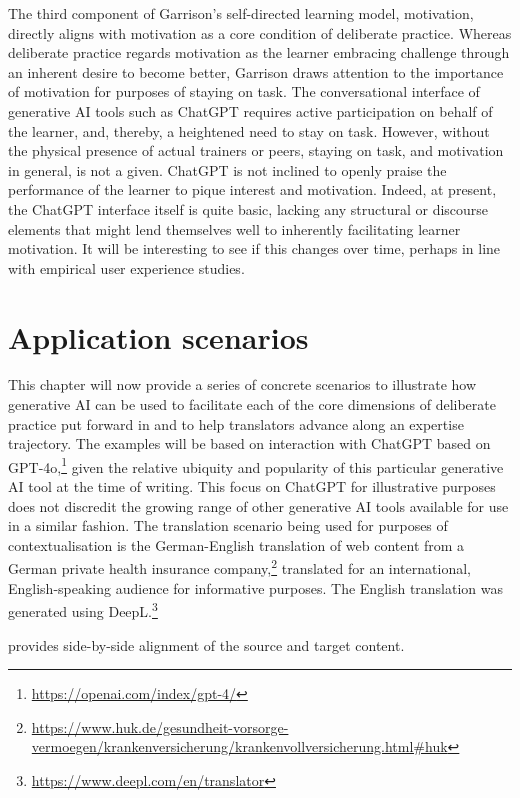 \documentclass[output=paper]{langscibook}
\begin{document}
The third component of Garrison’s self-directed learning model, motivation, directly aligns with motivation as a core condition of deliberate practice. Whereas deliberate practice regards motivation as the learner embracing challenge through an inherent desire to become better, Garrison draws attention to the importance of motivation for purposes of staying on task. The conversational interface of generative AI tools such as ChatGPT requires active participation on behalf of the learner, and, thereby, a heightened need to stay on task. However, without the physical presence of actual trainers or peers, staying on task, and motivation in general, is not a given. ChatGPT is not inclined to openly praise the performance of the learner to pique interest and motivation. Indeed, at present, the ChatGPT interface itself is quite basic, lacking any structural or discourse elements that might lend themselves well to inherently facilitating learner motivation. It will be interesting to see if this changes over time, perhaps in line with empirical user experience studies.

\section{Application scenarios}\label{sec:2:6}

This chapter will now provide a series of concrete scenarios to illustrate how generative AI can be used to facilitate each of the core dimensions of deliberate practice put forward in  and to help translators advance along an expertise trajectory. The examples will be based on interaction with ChatGPT based on GPT-4o,\footnote{\url{https://openai.com/index/gpt-4/}} given the relative ubiquity and popularity of this particular generative AI tool at the time of writing. This focus on ChatGPT for illustrative purposes does not discredit the growing range of other generative AI tools available for use in a similar fashion. The translation scenario being used for purposes of contextualisation is the German-English translation of web content from a German private health insurance company,\footnote{\url{https://www.huk.de/gesundheit-vorsorge-vermoegen/krankenversicherung/krankenvollversicherung.html\#huk}} translated for an international, English-speaking audience for informative purposes. The English translation was generated using DeepL.\footnote{\url{https://www.deepl.com/en/translator}}~

 provides side-by-side alignment of the source and target content.
\end{document}
